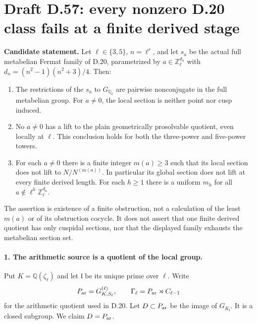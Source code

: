 \section*{Draft D.57: every nonzero D.20 class fails at a finite derived stage}

\noindent\textbf{Candidate statement.}
Let $\ell\in\{3,5\}$, $n=\ell^r$, and let
$s_a$ be the actual full metabelian Fermat family of D.20,
parametrized by $a\in\mathbb Z_\ell^{d_n}$ with
$d_n=(n^2-1)(n^2+3)/4$.  Then:
\begin{enumerate}
\item The restrictions of the $s_a$ to $G_{\mathbb Q_\ell}$
are pairwise nonconjugate in the full metabelian group.  For
$a\ne0$, the local section is neither point nor cusp induced.
\item No $a\ne0$ has a lift to the plain geometrically
prosolvable quotient, even locally at $\ell$.  This conclusion
holds for both the three-power and five-power towers.
\item For each $a\ne0$ there is a finite integer $m(a)\ge3$
such that its local section does not lift to $N/N^{(m(a))}$.
In particular its global section does not lift at every finite
derived length.  For each $h\ge1$ there is a uniform $m_h$ for
all $a\notin\ell^h\mathbb Z_\ell^{d_n}$.
\end{enumerate}
The assertion is existence of a finite obstruction, not a
calculation of the least $m(a)$ or of its obstruction cocycle.
It does not assert that one finite derived quotient has only
cuspidal sections, nor that the displayed family exhausts the
metabelian section set.

\paragraph{1. The arithmetic source is a quotient of the local group.}

Put $K=\mathbb Q(\zeta_\ell)$ and let $\mathfrak l$ be its
unique prime over $\ell$.  Write
\[
 P_{\rm ar}=G_{K,S_\ell}^{(\ell)},\qquad
 \Gamma_\ell=P_{\rm ar}\rtimes C_{\ell-1}
\]
for the arithmetic quotient used in D.20.  Let
$D\subset P_{\rm ar}$ be the image of $G_{K_{\mathfrak l}}$.
It is a closed subgroup.  We claim $D=P_{\rm ar}$.


